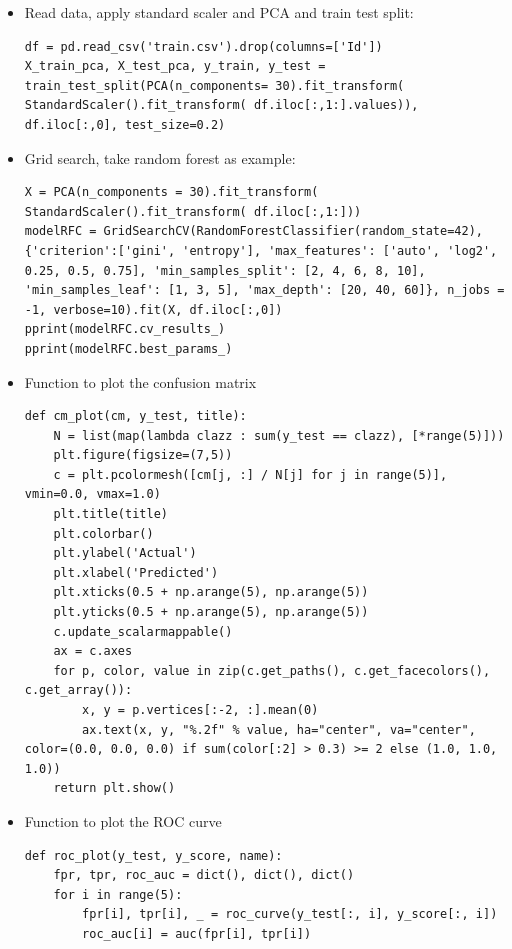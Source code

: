 \documentclass[12pt]{article}
\begin{document}
\begin{singlespacing}
\begin{itemize}
\item Read data, apply standard scaler and PCA and train test split:
\begin{verbatim}
df = pd.read_csv('train.csv').drop(columns=['Id'])
X_train_pca, X_test_pca, y_train, y_test = train_test_split(PCA(n_components= 30).fit_transform( StandardScaler().fit_transform( df.iloc[:,1:].values)), df.iloc[:,0], test_size=0.2)
\end{verbatim}

\item Grid search, take random forest as example:
\begin{verbatim}
X = PCA(n_components = 30).fit_transform( StandardScaler().fit_transform( df.iloc[:,1:]))
modelRFC = GridSearchCV(RandomForestClassifier(random_state=42), {'criterion':['gini', 'entropy'], 'max_features': ['auto', 'log2', 0.25, 0.5, 0.75], 'min_samples_split': [2, 4, 6, 8, 10], 'min_samples_leaf': [1, 3, 5], 'max_depth': [20, 40, 60]}, n_jobs = -1, verbose=10).fit(X, df.iloc[:,0])
pprint(modelRFC.cv_results_)
pprint(modelRFC.best_params_)
\end{verbatim}

\item Function to plot the confusion matrix
\begin{verbatim}
def cm_plot(cm, y_test, title):
    N = list(map(lambda clazz : sum(y_test == clazz), [*range(5)]))
    plt.figure(figsize=(7,5)) 
    c = plt.pcolormesh([cm[j, :] / N[j] for j in range(5)], vmin=0.0, vmax=1.0)
    plt.title(title)
    plt.colorbar()
    plt.ylabel('Actual')
    plt.xlabel('Predicted')
    plt.xticks(0.5 + np.arange(5), np.arange(5))
    plt.yticks(0.5 + np.arange(5), np.arange(5))
    c.update_scalarmappable()
    ax = c.axes
    for p, color, value in zip(c.get_paths(), c.get_facecolors(), c.get_array()):
        x, y = p.vertices[:-2, :].mean(0)
        ax.text(x, y, "%.2f" % value, ha="center", va="center", color=(0.0, 0.0, 0.0) if sum(color[:2] > 0.3) >= 2 else (1.0, 1.0, 1.0))
    return plt.show()
\end{verbatim}

\item Function to plot the ROC curve
\begin{verbatim}
def roc_plot(y_test, y_score, name):
    fpr, tpr, roc_auc = dict(), dict(), dict()
    for i in range(5):
        fpr[i], tpr[i], _ = roc_curve(y_test[:, i], y_score[:, i])
        roc_auc[i] = auc(fpr[i], tpr[i])


\end{verbatim}
\end{itemize}
\end{singlespacing}
\end{document}
